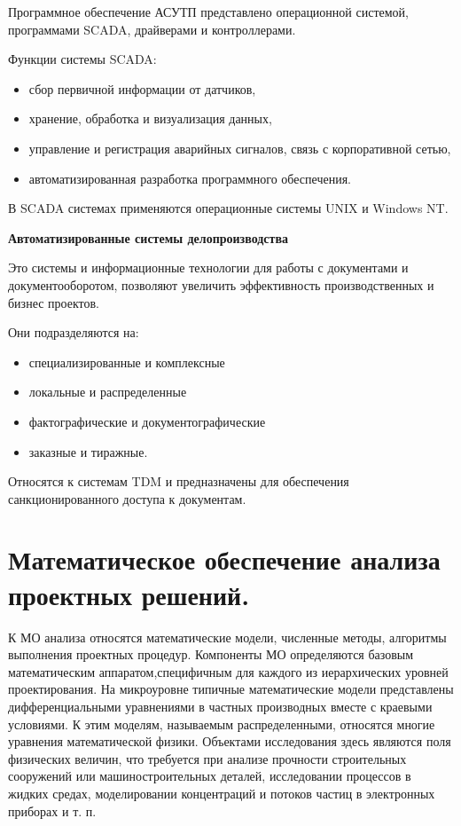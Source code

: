 \documentclass[unicode, 12pt, a4paper, oneside]{article}
\begin{document}
Программное обеспечение  АСУТП представлено операционной системой, программами SCADA, драйверами и контроллерами.

Функции системы SCADA:

\begin{itemize}
\item сбор первичной информации от датчиков,
\item хранение, обработка и визуализация данных,
\item управление и регистрация аварийных сигналов, связь с корпоративной сетью,
\item автоматизированная разработка программного обеспечения.
\end{itemize}

В SCADA системах применяются операционные системы UNIX и Windows NT.

\textbf{Автоматизированные системы делопроизводства}

Это системы и информационные технологии для работы с документами и документооборотом, позволяют увеличить эффективность производственных и бизнес проектов. 

Они подразделяются на: 

\begin{itemize}
\item специализированные и комплексные
\item локальные и распределенные
\item фактографические и документографические
\item заказные и тиражные. 
\end{itemize}

Относятся к системам TDM и предназначены для обеспечения санкционированного доступа к документам.

\section{Математическое обеспечение анализа проектных решений.}

К МО анализа относятся математические модели, численные методы, алгоритмы выполнения проектных процедур. Компоненты МО определяются базовым математическим аппаратом,специфичным для каждого из иерархических уровней проектирования. На микроуровне типичные математические модели представлены дифференциальными уравнениями в частных производных вместе с краевыми условиями. К этим моделям, называемым распределенными, относятся многие уравнения математической физики. Объектами исследования здесь являются поля физических величин, что требуется при анализе прочности строительных сооружений или машиностроительных деталей, исследовании процессов в жидких средах, моделировании концентраций и потоков частиц в электронных приборах и т. п.
\end{document}
